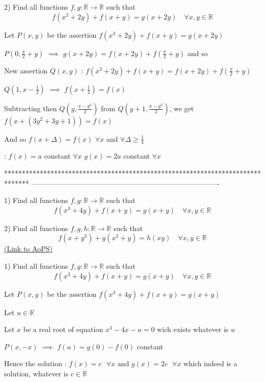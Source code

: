 \begin{solution}
	\begin{tcolorbox}2) Find all  functions $f,g:\mathbb{R}\to\mathbb{R}$   such that
\[f \left ( x^{3}+2y \right )+f(x+y)=g(x+2y) \quad \forall x,y \in \mathbb{R}\]\end{tcolorbox}
Let $P(x,y)$ be the assertion $f(x^3+2y)+f(x+y)=g(x+2y)$

$P(0,\frac x2+y)$ $\implies$ $g(x+2y)=f(x+2y)+f(\frac x2+y)$ and so 

New assertion $Q(x,y)$ : $f(x^3+2y)+f(x+y)=f(x+2y)+f(\frac x2+y)$

$Q(1,x-\frac 12)$ $\implies$ $f(x+\frac 12)=f(x)$

Subtracting then $Q(y,\frac{x-y^3}2)$ from $Q(y+1,\frac{x-y^3}2)$, we get $f(x+(3y^2+3y+1))=f(x)$

And so $f(x+\Delta)=f(x)$ $\forall x$ and $\forall \Delta\ge \frac 14$

 :
$f(x)=a$ constant $\forall x$
$g(x)=2a$ constant $\forall x$
\end{solution}
*******************************************************************************
-------------------------------------------------------------------------------

\begin{problem}
	1) Find all  functions $f,g:\mathbb{R}\to\mathbb{R}$   such that
\[f \left ( x^{3}+4y \right )+f(x+y)=g(x+y) \quad \forall x,y \in \mathbb{R}\]

2) Find all  functions $f,g,h:\mathbb{R}\to\mathbb{R}$   such that
\[f\left ( x+y^{3} \right )+g \left ( x^{3}+y \right )=h(xy) \quad \forall x,y \in \mathbb{R}\]
	\flushright \href{https://artofproblemsolving.com/community/c6h563286}{(Link to AoPS)}
\end{problem}



\begin{solution}
	\begin{tcolorbox}1) Find all  functions $f,g:\mathbb{R}\to\mathbb{R}$   such that
\[f \left ( x^{3}+4y \right )+f(x+y)=g(x+y) \quad \forall x,y \in \mathbb{R}\]\end{tcolorbox}
Let $P(x,y)$ be the assertion $f(x^3+4y)+f(x+y)=g(x+y)$

Let $u\in \mathbb R$

Let $x$ be a real root of equation $x^3-4x-u=0$ wich exists whatever is $u$

$P(x,-x)$ $\implies$ $f(u)=g(0)-f(0)$ constant

Hence the solution : $\boxed{f(x)=c\text{    }\forall x\text{ and }g(x)=2c\text{    }\forall x}$ which indeed is a solution, whatever is $c\in\mathbb R$
\end{solution}



